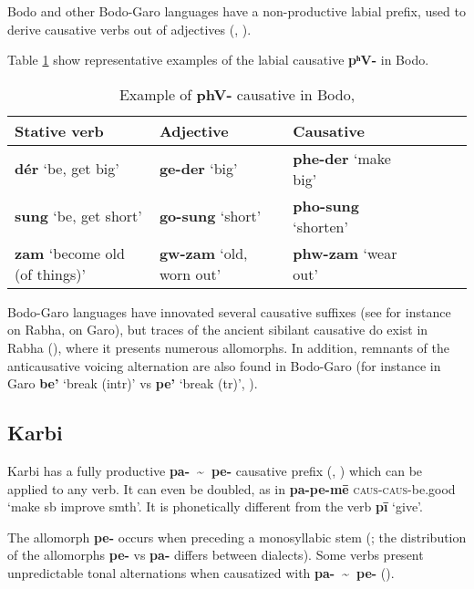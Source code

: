 \documentclass[oneside,a4paper,11pt]{article}
\newcommand{\ipa}[1]{\textbf{{\phon\mbox{#1}}}} %
\newcommand{\forme}[2]{\ipa{#1} `#2'}
\newcommand{\tld}{\textasciitilde{}}
\begin{document}
Bodo and other Bodo-Garo languages have a non-productive labial prefix, used to derive causative verbs out of adjectives (\citealt[90]{mazo04st}, \citealt{delancey15adjectival}).

Table \ref{tab:bodo.phV} show representative examples of the labial causative  \ipa{pʰV-} in Bodo.

\begin{table}[H]
\caption{Example of \ipa{phV-} causative in Bodo, \citet[54]{delancey15adjectival}} \label{tab:bodo.phV}
\begin{tabular}{lllllll}
\toprule
Stative verb & Adjective & Causative \\
\midrule
\forme{dér}{be, get big} & \forme{ge-der}{big} & \forme{phe-der}{make big} \\
\forme{sung}{be, get short} & \forme{go-sung}{short} & \forme{pho-sung}{shorten} \\
\forme{zam}{become old (of things)} & \forme{gw-zam}{old, worn out} & \forme{phw-zam}{wear out} \\
\bottomrule
\end{tabular}
\end{table}

Bodo-Garo languages have innovated several causative suffixes (see for instance \citealt[192-4]{joseph07rabha} on Rabha, \citealt[142]{burling04mandi} on Garo), but traces of the ancient sibilant causative do exist in Rabha (\citealt[196-201]{joseph07rabha}), where it presents numerous allomorphs. In addition, remnants of the anticausative voicing alternation are also found in Bodo-Garo (for instance in Garo \ipa{be'} `break (intr)' vs \ipa{pe'} `break (tr)', \citealt[112-3]{burling04mandi}). 

\subsection{Karbi} \label{sec:karbi}
Karbi has a fully productive \ipa{pa- \tld{} pe-} causative prefix (\citealt[93-4]{gruessner78mikir}, \citealt[238-9]{konnerth14karbi}) which can be applied to any verb. It can even be doubled, as in \ipa{pa-pe-mē} \textsc{caus-caus}-be.good `make sb improve smth'. It is phonetically different from the verb \ipa{pī} `give'.

The allomorph \ipa{pe-} occurs when preceding a monosyllabic stem (\citealt[105]{konnerth14karbi}; the distribution of the allomorphs \ipa{pe-} vs \ipa{pa-} differs between dialects). Some verbs present unpredictable tonal alternations when causatized with \ipa{pa- \tld{} pe-} (\citealt[103]{konnerth14karbi}). 
\end{document}
